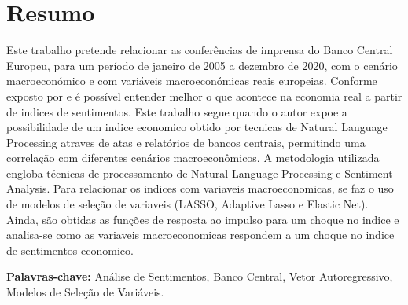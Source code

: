 \chapter*{Resumo}
Este trabalho pretende relacionar as conferências de imprensa do Banco Central Europeu, para um período de janeiro de 2005 a dezembro de 2020, com o cenário macroeconómico e com variáveis macroeconómicas reais europeias. Conforme exposto por \cite[]{shapiro2020measuring, shapiro2021taking} e \cite[]{barsky2012information} é possível entender melhor o que acontece na economia real a partir de indices de sentimentos. Este trabalho segue \cite{shapiro2020measuring} quando o autor expoe a possibilidade de um indice economico obtido por tecnicas de Natural Language Processing atraves de atas e relatórios de bancos centrais, permitindo uma correlação com diferentes cenários macroeconômicos. A metodologia utilizada engloba técnicas de processamento de Natural Language Processing e Sentiment Analysis. Para relacionar os indices com variaveis macroeconomicas, se faz o uso de modelos de seleção de variaveis (LASSO, Adaptive Lasso e Elastic Net). Ainda, são obtidas as funções de resposta ao impulso para um choque no indice e analisa-se como as variaveis macroeconomicas respondem a um choque no indice de sentimentos economico.



\par
\vspace{0.5in}

\noindent
{\bf Palavras-chave:} Análise de Sentimentos, Banco Central, Vetor Autoregressivo, Modelos de Seleção de Variáveis.